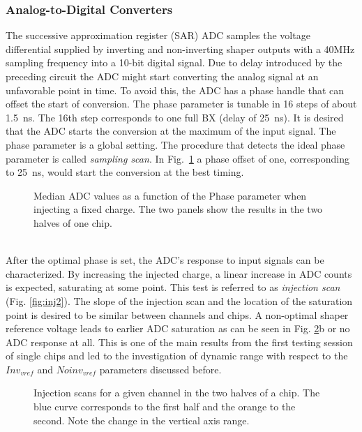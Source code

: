 \documentclass[../../main.tex]{subfiles}
\begin{document}
\subsubsection{Analog-to-Digital Converters}
The successive approximation register (SAR) ADC samples the voltage differential supplied by inverting and non-inverting shaper outputs with a 40MHz sampling frequency into a 10-bit digital signal. Due to delay introduced by the preceding circuit the ADC might start converting the analog signal at an unfavorable point in time. To avoid this, the ADC has a phase handle that can offset the start of conversion. The phase parameter is tunable in 16 steps of about \SI{1.5}{ns}. The 16th step corresponds to one full BX (delay of \SI{25}{ns}). It is desired that the ADC starts the conversion at the maximum of the input signal. The phase parameter is a global setting. The procedure that detects the ideal phase parameter is called \textit{sampling scan}. In Fig.~\ref{fig:sampScan} a phase offset of one, corresponding to \SI{25}{ns}, would start the conversion at the best timing.\\
\begin{figure}[htp]
		\caption{Median ADC values as a function of the Phase parameter when injecting a fixed charge. The two panels show the results in the two halves of one chip.}
		\label{fig:sampScan}
\end{figure}
\\
After the optimal phase is set, the ADC's response to input signals can be characterized. By increasing the injected charge, a linear increase in ADC counts is expected, saturating at some point. This test is referred to as \textit{injection scan} (Fig. \ref{fig:inj2}). The slope of the injection scan and the location of the saturation point is desired to be similar between channels and chips. A non-optimal shaper reference voltage leads to earlier ADC saturation as can be seen in Fig. \ref{fig:inj}b or no ADC response at all. This is one of the main results from the first testing session of single chips and led to the investigation of dynamic range with respect to the $Inv_{vref}$ and $Noinv_{vref}$ parameters discussed before.

\begin{figure}[htp]
	\centering
		\caption{Injection scans for a given channel in the two halves of a chip. The blue curve corresponds to the first half and the orange to the second. Note the change in the vertical axis range.} \label{fig:inj}
\end{figure}
\end{document}
